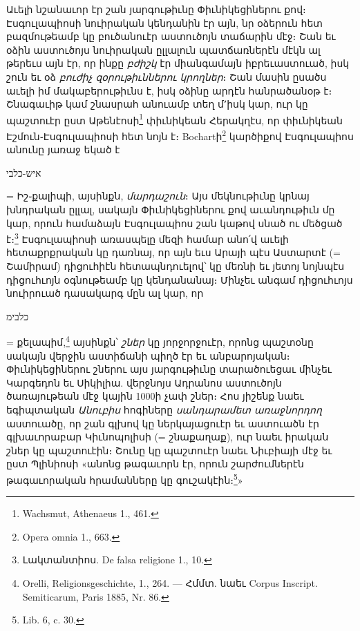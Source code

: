 \documentclass{article}
\begin{document}
{Աւելի նշանաւոր էր շան յարգութիւնը Փիւնիկեցիներու քով։ Էսգուլապիոսի նուիրական կենդանին էր այն, նր օձերուն հետ բազմութեամբ կը բուծանուէր աստուծոյն տաճարին մէջ։ Շան եւ օձին աստուծոյս նուիրական ըլլալուն պատճառներէն մէկն ալ թերեւս այն էր, որ ինքը \emph{բժիշկ} էր միանգամայն իբրեւաստուած, իսկ շուն եւ օձ \emph{բուժիչ զօրութիւններու կրողներ}։ Շան մասին ըսածս աւելի իմ մակաբերութիւնս է, իսկ օձինը արդէն հանրածանօթ է։ Շնագաւիթ կամ շնասրահ անուամբ տեղ մ՚իսկ կար, ուր կը պաշտուէր ըստ Աթենէոսի\footnote{Wachsmut, Athenaeus 1., 461.} փիւնիկեան Հերակղէս, որ փիւնիկեան Էշմուն֊Էսգուլապիոսի հետ նոյն է։ Bochartի\footnote{Opera omnia 1., 663.} կարծիքով Էսգուլապիոս անունը յառաջ եկած է \begin{hebrewfont}איש-כלבי\end{hebrewfont} = Իշ֊քալիպի, այսինքն, \emph{մարդաշուն}։ Այս մեկնութիւնը կրնայ խնդրական ըլլալ, սակայն Փիւնիկեցիներու քով աւանդութիւն մը կար, որուն համաձայն Էսգուլապիոս շան կաթով սնած ու մեծցած է։\footnote{Լակտանտիոս. De falsa religione 1., 10.} Էսգուլապիոսի առասպելը մեզի համար անո՛վ աւելի հետաքրքրական կը դառնայ, որ այն եւս Արայի պէս Աստարտէ (= Շամիրամ) դիցուհիէն հետապնդուելով՝ կը մեռնի եւ յետոյ նոյնպէս դիցուհւոյն օգնութեամբ կը կենդանանայ։ Մինչեւ անգամ դիցուհւոյս նուիրուած դասակարգ մըն ալ կար, որ \begin{hebrewfont}כלבימ\end{hebrewfont} = քելապիմ,\footnote{Orelli, Religionsgeschichte, 1., 264. — Հմմտ. նաեւ Corpus Inscript. Semiticarum, Paris 1885, Nr. 86.} այսինքն՝ \emph{շներ} կը յորջորջուէր, որոնց պաշտօնը սակայն վերջին աստիճանի պիղծ էր եւ անբարոյական։ Փիւնիկեցիներու շներու այս յարգութիւնը տարածուեցաւ մինչեւ Կարգեդոն եւ Սիկիլիա. վերջնոյս Ադրանոս աստուծոյն ծառայութեան մէջ կային 1000ի չափ շներ։ Հոս յիշենք նաեւ եգիպտական \emph{Անուբիս} հոգիները \emph{սանդարամետ առաջնորդող} աստուածը, որ շան գլխով կը ներկայացուէր եւ աստուածն էր գլխաւորաբար Կիւնոպոլիսի (= շնաքաղաք), ուր նաեւ իրական շներ կը պաշտուէին։ Շունը կը պաշտուէր նաեւ Նիւբիայի մէջ եւ ըստ Պլինիոսի «անոնց թագաւորն էր, որուն շարժումներէն թագաւորական հրամանները կը գուշակէին։\footnote{Lib. 6, c. 30.}»

}
\end{document}
